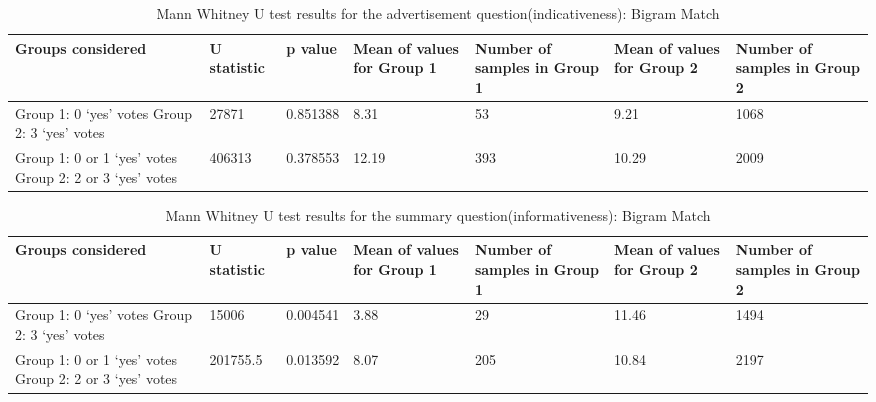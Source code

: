 \begin{table}[!htbp]
\centering
\begin{tabular}{|p{}|p{}|p{}|p{}|p{}|p{}|p{}|}
\hline
\textbf{Groups considered}    & \textbf{U statistic} & \textbf{p value} & \textbf{Mean of values for Group 1} & \textbf{Number of samples in Group 1} & \textbf{Mean of values for Group 2} & \textbf{Number of samples in Group 2}\\ \hline
Group 1: 0 `yes' votes \newline Group 2: 3 `yes' votes & 27871 & 0.851388 & 8.31 & 53 & 9.21 & 1068  \\ \hline
Group 1: 0 or 1 `yes' votes \newline Group 2: 2 or 3 `yes' votes& 406313 & 0.378553 & 12.19 & 393 & 10.29 & 2009 \\ \hline
\end{tabular}
\caption{Mann Whitney U test results for the advertisement question(indicativeness): Bigram Match}
\label{tab:bicorr1}
\end{table}

\begin{table}[!htbp]
\centering
\begin{tabular}{|p{}|p{}|p{}|p{}|p{}|p{}|p{}|}
\hline
\textbf{Groups considered}    & \textbf{U statistic} & \textbf{p value} & \textbf{Mean of values for Group 1} & \textbf{Number of samples in Group 1} & \textbf{Mean of values for Group 2} & \textbf{Number of samples in Group 2}\\ \hline
Group 1: 0 `yes' votes \newline Group 2: 3 `yes' votes & 15006 & 0.004541 & 3.88 & 29 & 11.46 & 1494  \\ \hline
Group 1: 0 or 1 `yes' votes \newline Group 2: 2 or 3 `yes' votes & 201755.5 & 0.013592 & 8.07 & 205 & 10.84 & 2197 \\ \hline
\end{tabular}
\caption{Mann Whitney U test results for the summary question(informativeness): Bigram Match}
\label{tab:bicorr2}
\end{table}



